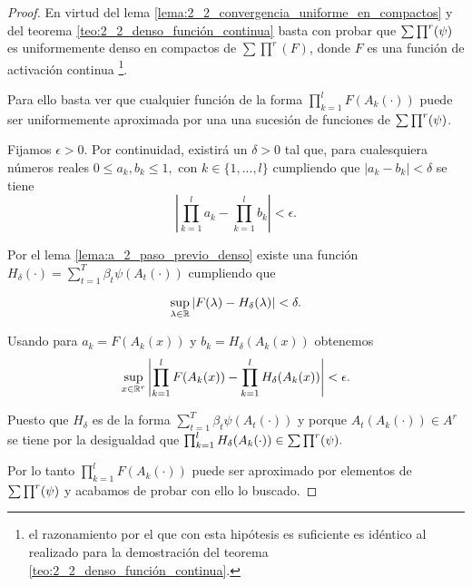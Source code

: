 \begin{proof}
    En virtud del lema \ref{lema:2_2_convergencia_uniforme_en_compactos} y del 
    teorema \ref{teo:2_2_denso_función_continua} basta con probar que 
    $\sum \prod^r (\psi)$ es uniformemente denso en compactos de $\sum \prod^r(F)$, 
    donde $F$ es una función de activación continua 
    \footnote{el razonamiento 
    por el que con esta hipótesis es suficiente es idéntico al realizado para la 
    demostración del teorema \ref{teo:2_2_denso_función_continua}.}.

    Para ello basta ver que cualquier función de la forma $\prod_{k=1}^l F(A_k(\cdot))$
    puede ser uniformemente aproximada por una una sucesión de funciones de $\sum \prod^r (\psi)$.

    Fijamos $\epsilon > 0$. 
    Por continuidad, existirá un $\delta >0$
    tal que, para cualesquiera números reales $0 \leq a_k, b_k \leq 1,$ con $k \in \{1,...,l\}$ 
    cumpliendo que $|a_k -b_k| < \delta$ se tiene
    \begin{equation} \label{eq:teorema_2_3__1}
        \left| 
            \prod^l_{k=1} a_k - \prod^l_{k=1} b_k 
        \right| 
        < 
        \epsilon.
    \end{equation}

    Por el lema \ref{lema:a_2_paso_previo_denso} existe una función 
    $H_{\delta}(\cdot) = \sum_{t=1}^T \beta_t \psi(A_t(\cdot))$
    cumpliendo que 

    \begin{equation}
        \sup_{\lambda \in \mathbb{R}} |F(\lambda) - H_{\delta}(\lambda) | < \delta.
    \end{equation}

    Usando  para 
    $a_k = F(A_k(x))$ y $b_k = H_\delta(A_k(x))$
    obtenemos
    \begin{equation}\label{eq:teorema2_3__3}
        \sup_{x \in \mathbb{R}^r} 
        \left| 
            \prod ^l_{k=1} F(A_k(x))
            -
            \prod ^l_{k=1} H_\delta(A_k(x))
        \right| 
        < 
        \epsilon.
    \end{equation} 
    
    Puesto que $H_\delta$ es de la forma  $\sum_{t=1}^T \beta_t \psi(A_t(\cdot))$ 
    y porque $A_t(A_k(\cdot)) \in A^r$ se tiene por la desigualdad  que 
    $\prod ^l_{k=1} H_\delta(A_k(\cdot)) \in \sum \prod^r (\psi).$

    Por lo tanto $\prod ^l_{k=1} F(A_k(\cdot))$ puede ser 
    aproximado por elementos de $\sum \prod^r (\psi)$ y acabamos de probar con ello lo buscado. 
\end{proof} 

